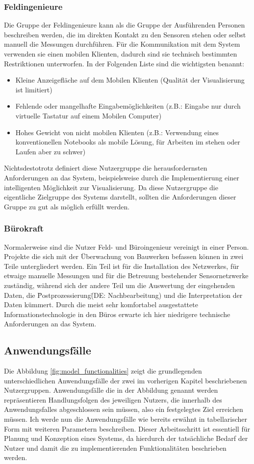 \subsubsection{Feldingenieure}
Die Gruppe der Feldingenieure kann als die Gruppe der Ausführenden Personen beschreiben werden, die im direkten Kontakt zu den Sensoren stehen oder selbst manuell die Messungen durchführen. Für die Kommunikation mit dem System verwenden sie einen mobilen Klienten, dadurch sind sie technisch bestimmten Restriktionen unterworfen. In der Folgenden Liste sind die wichtigsten benannt:
\begin{itemize}
\item Kleine Anzeigefläche auf dem Mobilen Klienten (Qualität der Visualisierung ist limitiert)
\item Fehlende oder mangelhafte Eingabemöglichkeiten (z.B.: Eingabe nur durch virtuelle Tastatur auf einem Mobilen Computer)
\item Hohes Gewicht von nicht mobilen Klienten (z.B.: Verwendung eines konventionellen Notebooks als mobile Lösung, für Arbeiten im stehen oder Laufen aber zu schwer)
\end{itemize}
Nichtsdestotrotz definiert diese Nutzergruppe die herausfordernsten Anforderungen an das System, beispielsweise durch die Implementierung einer intelligenten Möglichkeit zur Visualisierung. Da diese Nutzergruppe die eigentliche Zielgruppe des Systems darstellt, sollten die Anforderungen dieser Gruppe zu gut als möglich erfüllt werden.

\subsubsection{Bürokraft}
Normalerweise sind die Nutzer Feld- und Büroingenieur vereinigt in einer Person. Projekte die sich mit der Überwachung von Bauwerken befassen können in zwei Teile untergliedert werden. Ein Teil ist für die Installation des Netzwerkes, für etwaige manuelle Messungen und für die Betreuung bestehender Sensornetzwerke zuständig, während sich der andere Teil um die Auswertung der eingehenden Daten, die \"Postprozessierung\" (DE: Nachbearbeitung) und die Interpretation der Daten kümmert. Durch die meist sehr komfortabel ausgestattete Informationstechnologie in den Büros erwarte ich hier niedrigere technische Anforderungen an das System.

\subsection{Anwendungsfälle}
Die Abbildung \ref{fig:model_functionalities} zeigt die grundlegenden unterschiedlichen Anwendungsfälle der zwei im vorherigen Kapitel beschriebenen Nutzergruppen. Anwendungsfälle die in der Abbildung genannt werden repräsentieren Handlungsfolgen des jeweiligen Nutzers, die innerhalb des Anwendungsfalles abgeschlossen sein müssen, also ein festgelegtes Ziel erreichen müssen. Ich werde nun die Anwendungsfälle wie bereits erwähnt in tabellarischer Form mit weiteren Parametern beschreiben. Dieser Arbeitsschritt ist essentiell für Planung und Konzeption eines Systems, da hierdurch der tatsächliche Bedarf der Nutzer und damit die zu implementierenden Funktionalitäten beschrieben werden.

